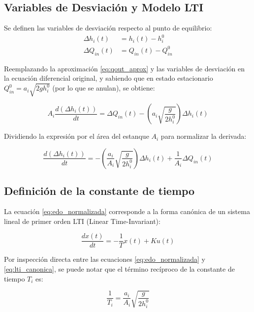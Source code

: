 \subsection{Variables de Desviación y Modelo LTI}
Se definen las variables de desviación respecto al punto de equilibrio:
\begin{align*}
\Delta h_i(t) &= h_i(t) - h_i^0 \\
\Delta Q_{in}(t) &= Q_{in}(t) - Q_{in}^0
\end{align*}

Reemplazando la aproximación \eqref{eq:qout_aprox} y las variables de desviación en la ecuación diferencial original, y sabiendo que en estado estacionario $Q_{in}^0 = a_i \sqrt{2g h_i^0}$ (por lo que se anulan), se obtiene:

\begin{equation}
A_i \frac{d(\Delta h_i(t))}{dt} = \Delta Q_{in}(t) - \left( a_i \sqrt{\frac{g}{2 h_i^0}} \right) \Delta h_i(t)
\label{eq:edo_desviacion}
\end{equation}

Dividiendo la expresión por el área del estanque $A_i$ para normalizar la derivada:

\begin{equation}
\frac{d(\Delta h_i(t))}{dt} = - \left( \frac{a_i}{A_i} \sqrt{\frac{g}{2 h_i^0}} \right) \Delta h_i(t) + \frac{1}{A_i} \Delta Q_{in}(t)
\label{eq:edo_normalizada}
\end{equation}

\subsection{Definición de la constante de tiempo}
La ecuación \eqref{eq:edo_normalizada} corresponde a la forma canónica de un sistema lineal de primer orden LTI (Linear Time-Invariant):

\begin{equation}
\frac{dx(t)}{dt} = -\frac{1}{T} x(t) + K u(t)
\label{eq:lti_canonica}
\end{equation}

Por inspección directa entre las ecuaciones \eqref{eq:edo_normalizada} y \eqref{eq:lti_canonica}, se puede notar que el término recíproco de la constante de tiempo $T_i$ es:

\begin{equation}
\frac{1}{T_i} = \frac{a_i}{A_i} \sqrt{\frac{g}{2 h_i^0}}
\label{eq:ti_inversa}
\end{equation}

